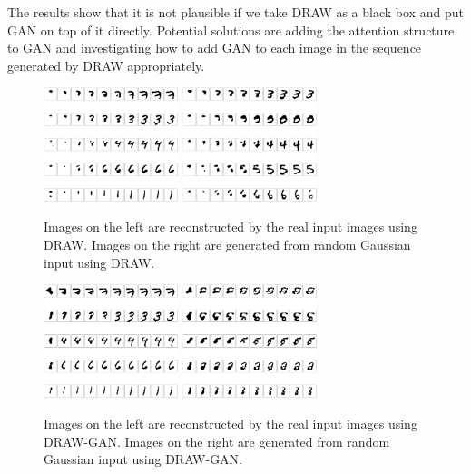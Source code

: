 \documentclass[10pt]{article}
\begin{document}
The results show that it is not plausible if we take DRAW as a black box and put GAN on top of it directly. Potential solutions are adding the attention structure to GAN and investigating how to add GAN to each image in the sequence generated by DRAW appropriately.
\begin{figure}[!ht]
\centering
\includegraphics[width=0.35\textwidth]{images/draw_inference.png}
\includegraphics[width=0.35\textwidth]{images/draw_generate.png}
\caption{Images on the left are reconstructed by the real input images using DRAW. Images on the right are generated from random Gaussian input using DRAW. }
\label{figure:draw}
\end{figure}

\begin{figure}[!ht]
\centering
\includegraphics[width=0.35\textwidth]{images/drwa_gan_inference.png}
\includegraphics[width=0.35\textwidth]{images/draw_gan.png}
\caption{Images on the left are reconstructed by the real input images using DRAW-GAN. Images on the right are generated from random Gaussian input using DRAW-GAN. }
\label{figure:draw_gan}

\end{figure}
\end{document}
